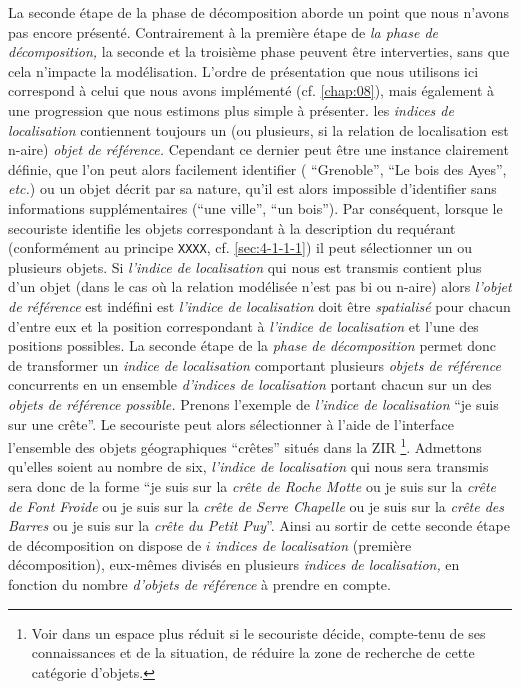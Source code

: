 La seconde étape de la phase de décomposition aborde un point que
nous n'avons pas encore présenté.
%
Contrairement à la première étape de \emph{la phase de décomposition,}
la seconde et la troisième phase peuvent être interverties, sans que
cela n'impacte la modélisation. L'ordre de présentation que nous
utilisons ici correspond à celui que nous avons implémenté
(cf. \autoref{chap:08}), mais également à une progression que nous
estimons plus simple à présenter.
%
les \emph{indices de localisation} contiennent toujours un (ou
plusieurs, si la relation de localisation est n-aire) \emph{objet de
  référence.} Cependant ce dernier peut être une instance clairement
définie, que l'on peut alors facilement identifier (\eg
\enquote{Grenoble}, \enquote{Le bois des Ayes}, \emph{etc.}) ou un
objet décrit par sa nature, qu'il est alors impossible d'identifier
sans informations supplémentaires (\eg \enquote{une ville},
\enquote{un bois}). Par conséquent, lorsque le secouriste identifie
les objets correspondant à la description du requérant (conformément
au principe \texttt{XXXX}, cf. \ref{sec:4-1-1-1}) il peut sélectionner
un ou plusieurs objets. Si \emph{l'indice de localisation} qui nous
est transmis contient plus d'un objet (dans le cas où la relation
modélisée n'est pas bi ou n-aire) alors \emph{l'objet de référence}
est indéfini est \emph{l'indice de localisation} doit être
\emph{spatialisé} pour chacun d'entre eux et la position correspondant
à \emph{l'indice de localisation} et l'une des positions possibles.
La seconde étape de la \emph{phase de décomposition} permet donc de
transformer un \emph{indice de localisation} comportant plusieurs
\emph{objets de référence} concurrents en un ensemble \emph{d'indices
  de localisation} portant chacun sur un des \emph{objets de référence
  possible.} Prenons l'exemple de \emph{l'indice de localisation}
\enquote{je suis sur une crête}. Le secouriste peut alors sélectionner
à l'aide de l'interface l'ensemble des objets géographiques
\enquote{crêtes} situés dans la ZIR \footnote{Voir dans un espace plus
  réduit si le secouriste décide, compte-tenu de ses connaissances et
  de la situation, de réduire la zone de recherche de cette catégorie
  d'objets.}. Admettons qu'elles soient au nombre de six,
\emph{l'indice de localisation} qui nous sera transmis sera donc de la
forme \enquote{je suis sur la \emph{crête de Roche Motte} ou je suis
  sur la \emph{crête de Font Froide} ou je suis sur la \emph{crête de
    Serre Chapelle} ou je suis sur la \emph{crête des Barres} ou je
  suis sur la \emph{crête du Petit Puy}}. Ainsi au sortir de cette
seconde étape de décomposition on dispose de \(i\) \emph{indices de
  localisation} (première décomposition), eux-mêmes divisés en
plusieurs \emph{indices de localisation,} en fonction du nombre
\emph{d'objets de référence} à prendre en compte.

